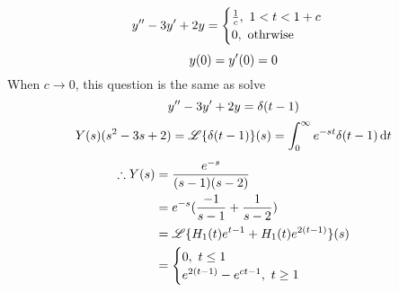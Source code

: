 \begin{example}
\[y^{\prime\prime}-3y^{\prime}+2y=\begin{cases}\frac{1}{c},~1<t<1+c\\0,~ \text{othrwise}\end{cases}
\]
\[y(0)=y^{\prime}(0)=0
\]
When $c\rightarrow0$, this question is the same as solve 
\[y^{\prime\prime}-3y^{\prime}+2y=\delta(t-1)
\]
\[Y(s)(s^2-3s+2)=\mathscr{L}\{\delta(t-1)\}(s)=\int_0^\infty e^{-st}\delta(t-1)\,\mathrm{d} t
\]
\[\begin{aligned}
\therefore Y(s)&=\frac{e^{-s}}{(s-1)(s-2)}\\
&=e^{-s}(\frac{-1}{s-1}+\frac{1}{s-2})\\
&=\mathscr{L}\{H_1(t)e^{t-1}+H_1(t)e^{2(t-1)}\}(s)\\
&=\begin{cases}0,~t\leq1\\e^{2(t-1)}-e^{ct-1},~t\geq1\end{cases}
\end{aligned}
\]




\end{example}











